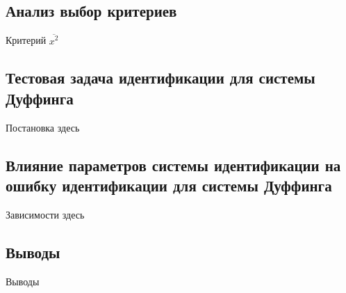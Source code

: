 
\subsection{Анализ выбор критериев}  %

Критерий
$\overline{x^2}$



\subsection{Тестовая задача идентификации для системы Дуффинга}  %

Постановка здесь


\subsection{Влияние параметров системы идентификации на ошибку идентификации для системы Дуффинга}  %


Зависимости здесь


\subsection{Выводы}  %

Выводы



